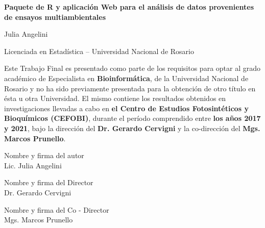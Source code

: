 
\begin{center}
\textbf{\Large{Paquete de R y aplicación Web para el análisis de datos provenientes de ensayos multiambientales}}
\end{center}

\vspace{1.5cm}

\begin{center}
Julia Angelini

\vspace{0.5cm}
Licenciada en Estadística – Universidad Nacional de Rosario
\end{center}
\vspace{1.5cm}
Este Trabajo Final es presentado como parte de los requisitos para optar al grado académico de Especialista en \textbf{Bioinformática}, de la Universidad Nacional de Rosario y no ha sido previamente presentada para la obtención de otro título en ésta u otra Universidad. El mismo contiene los resultados obtenidos en investigaciones llevadas a cabo en \textbf{el Centro de Estudios Fotosintéticos y Bioquímicos (CEFOBI)}, durante el período comprendido entre \textbf{los años 2017 y 2021}, bajo la dirección del \textbf{Dr. Gerardo Cervigni} y la co-dirección del \textbf{Mgs. Marcos Prunello}.  

\vspace{1.25cm}
Nombre y firma del autor\\
\vspace{0.05cm}
\hspace{0.95cm}Lic. Julia Angelini

\vspace{1.25cm}
Nombre y firma del Director\\
\vspace{0.05cm}
\hspace{0.95cm}Dr. Gerardo Cervigni
 
\vspace{1.25cm}
Nombre y firma del Co - Director\\
\vspace{0.05cm}
\hspace{1.3cm}Mgs. Marcos Prunello
\vspace{1.85cm}



